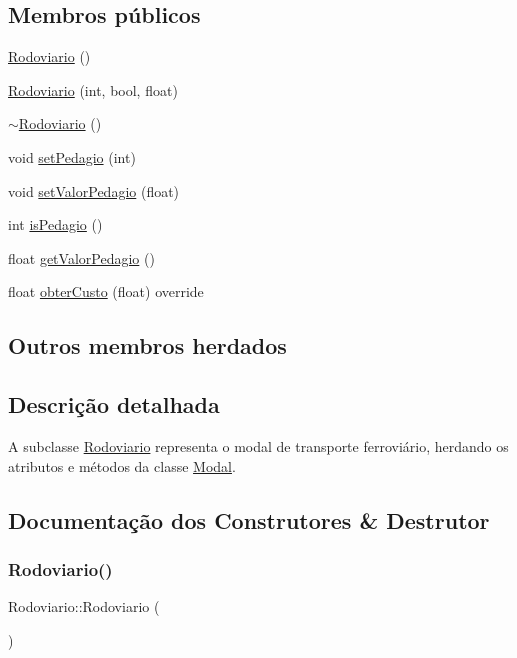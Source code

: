 \subsection*{Membros públicos}
\begin{DoxyCompactItemize}
\item 
\hyperlink{classRodoviario_a91f98005c09609f74f4de02c1907481d}{Rodoviario} ()
\item 
\hyperlink{classRodoviario_a56cdc15643e5d023e2d4c61139ecc16d}{Rodoviario} (int, bool, float)
\item 
\hyperlink{classRodoviario_a11df25b437139f12013adc0d861b7970}{$\sim$\+Rodoviario} ()
\item 
void \hyperlink{classRodoviario_a14273f1bc7d5a0b237846749fbe2221e}{set\+Pedagio} (int)
\item 
void \hyperlink{classRodoviario_a920f911349153ac9e95df101fe1afe0c}{set\+Valor\+Pedagio} (float)
\item 
int \hyperlink{classRodoviario_aa3c5c3b649b9aa4bde43e2154b940c89}{is\+Pedagio} ()
\item 
float \hyperlink{classRodoviario_a4c62b1d1a5e924a60b185b2023034943}{get\+Valor\+Pedagio} ()
\item 
float \hyperlink{classRodoviario_a907ec064fb54db8a05b480cf58c5fe57}{obter\+Custo} (float) override
\end{DoxyCompactItemize}
\subsection*{Outros membros herdados}


\subsection{Descrição detalhada}
A subclasse \hyperlink{classRodoviario}{Rodoviario} representa o modal de transporte ferroviário, herdando os atributos e métodos da classe \hyperlink{classModal}{Modal}. 

\subsection{Documentação dos Construtores \& Destrutor}
\mbox{\label{classRodoviario_a91f98005c09609f74f4de02c1907481d}} 
\subsubsection{\texorpdfstring{Rodoviario()}{Rodoviario()}\hspace{0.1cm}{\footnotesize\ttfamily [1/2]}}
{\footnotesize\ttfamily Rodoviario\+::\+Rodoviario (\begin{DoxyParamCaption}{ }\end{DoxyParamCaption})}

